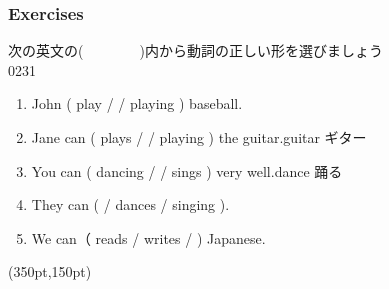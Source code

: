\documentclass[aspectratio=169,xcolor={dvipsnames,table}]{beamer}
\newcommand{\myaudio}[1]{\href{#1}{\faVolumeUp}}
\begin{document}
\begin{frame}[plain,t]\frametitle{Exercises}

{\small 次の英文の(~~~~~~~~)内から動詞の正しい形を選びましょう}\\%
\hfill{\tiny 0231}\,{\scriptsize \myaudio{./audio/012_can_03.mp3}}


\begin{enumerate}
 \item John ( play /  / playing ) baseball.
 \item Jane can ( plays /  / playing ) the guitar.\hfill{\scriptsize guitar  ギター}
 \item You can ( dancing /  / sings  ) very well.\hfill{}{\scriptsize dance  踊る}
 \item They can (  / dances / singing ).
 \item We can（ reads / writes / ) Japanese.
\end{enumerate}

\begin{textblock*}{0.4\linewidth}(350pt,150pt)
\end{textblock*}
\end{frame}
\end{document}
